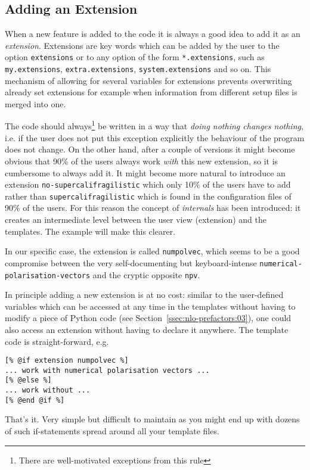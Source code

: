 \documentclass[11pt,a4paper]{refrep}
\begin{document}
\subsection{Adding an Extension}
When a new feature is added to the code it is always a good idea to add it
as an \emph{extension}. Extensions are key words which can be added by
the user to the option \texttt{extensions} or to any option of the
form \texttt{*.extensions}, such as \texttt{my.extensions},
\texttt{extra.extensions}, \texttt{system.extensions} and so on.
This mechanism of allowing for
several variables for extensions prevents overwriting already set extensions
for example when information from different setup files is merged into one.

The code should always\footnote{There are well-motivated exceptions from
this rule} be written in a way that \emph{doing nothing changes nothing},
i.e. if the user does not put this exception explicitly the behaviour of
the program does not change. On the other hand, after a couple of versions
it might become obvious that 90\% of the users always work \emph{with}
this new extension, so it is cumbersome to always add it. It might become
more natural to introduce an extension \texttt{no-supercalifragilistic}
which only 10\% of the users have to add
rather than \texttt{supercalifragilistic} which is found in the configuration
files of 90\% of the users. For this reason the concept
of \emph{internals} has been introduced: it creates an intermediate level
between the user view (extension) and the templates. The example will
make this clearer.

In our specific case, the extension is called \texttt{numpolvec},
which seems to be a good compromise between the very self-documenting
but keyboard-intense \texttt{numerical-polarisation-vectors} and the
cryptic opposite \texttt{npv}.

In principle adding a new extension is at no cost: similar to the
user-defined variables which can be accessed at any time in the templates
without having to modify a piece of Python code
(see Section~\ref{ssec:nlo-prefactors:03}), one could also access
an extension without having to declare it anywhere. The template
code is straight-forward, e.g.
\begin{lstlisting}
[% @if extension numpolvec %]
... work with numerical polarisation vectors ...
[% @else %]
... work without ...
[% @end @if %]
\end{lstlisting}
That's it. Very simple but difficult to maintain as you might end up
with dozens of such if-statements spread around all your template files.
\end{document}
